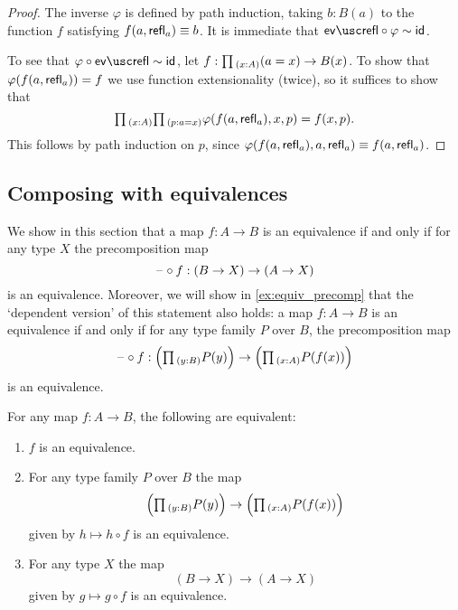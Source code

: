 \begin{proof}
The inverse $\varphi$ is defined by path induction, taking $b:B(a)$ to the function $f$ satisfying $f(a,\mathsf{refl}_{a})\equiv b$. It is immediate that $\evrefl\circ\varphi\htpy \idfunc$.

To see that $\varphi\circ \evrefl\htpy\idfunc$, let $f:\prd{x:A}(a=x)\to B(x)$. To show that $\varphi(f(a,\mathsf{refl}_{a}))=f$ we use function extensionality (twice), so it suffices to show that
\begin{equation*}
\prd{x:A}{p:a=x} \varphi(f(a,\refl{a}),x,p)=f(x,p).
\end{equation*}
This follows by path induction on $p$, since $\varphi(f(a,\mathsf{refl}_{a}),a,\mathsf{refl}_{a})\equiv f(a,\mathsf{refl}_{a})$.
\end{proof}

\subsection{Composing with equivalences}

We show in this section that a map $f:A\to B$ is an equivalence if and only if for any type $X$ the precomposition map
\begin{equation*}
\mathord{\hspace{1pt}\text{--}\hspace{1pt}}\circ f: (B\to X)\to (A\to X)
\end{equation*}
is an equivalence. Moreover, we will show in \cref{ex:equiv_precomp} that the `dependent version' of this statement also holds: a map $f:A\to B$ is an equivalence if and only if for any type family $P$ over $B$, the precomposition map
\begin{equation*}
\blank\circ f: \Big(\prd{y:B}P(y)\Big)\to\Big(\prd{x:A}P(f(x))\Big)
\end{equation*}
is an equivalence.

\begin{thm}\label{ex:equiv_precomp}
For any map $f:A\to B$, the following are equivalent:
\begin{enumerate}
\item $f$ is an equivalence.
\item For any type family $P$ over $B$ the map
\begin{equation*}
\Big(\prd{y:B}P(y)\Big)\to\Big(\prd{x:A}P(f(x))\Big)
\end{equation*}
given by $h\mapsto h\circ f$ is an equivalence.
\item For any type $X$ the map
\begin{equation*}
(B\to X)\to (A\to X)
\end{equation*}
given by $g\mapsto g\circ f$ is an equivalence. 
\end{enumerate}
\end{thm}

